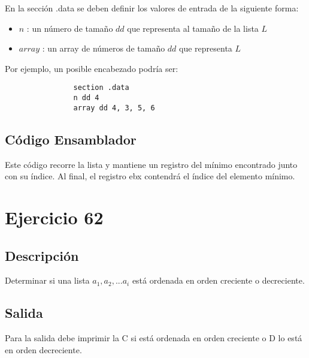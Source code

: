 \documentclass[a4paper]{article}
\begin{document}
\begin{flushleft}
      		En la sección .data se deben definir los valores de entrada de la siguiente forma:
      		
      		\begin{itemize}
      			
      			\item $n$ : un número de tamaño $dd$ que representa al tamaño de la lista $L$
      			
      			\item $array$ : un array de números de tamaño $dd$ que representa $L$
      			
      			
      		\end{itemize}
      	
      		Por ejemplo, un posible encabezado podría ser:
      		
      		\begin{lstlisting}
      			section .data
      			n dd 4
      			array dd 4, 3, 5, 6
      		\end{lstlisting}
      		
      		\subsection*{Código Ensamblador}
      		
      		Este código recorre la lista y mantiene un registro del mínimo encontrado junto con su índice. Al final, el registro ebx contendrá el índice del elemento mínimo.
      		
      		\section{Ejercicio 62}
      		
      		\subsection*{Descripción}
      		
      		 Determinar si una lista $a_{1}, a_{2}, ... a_{i}$ está ordenada en orden creciente o decreciente.
      		 
      		 \subsection*{Salida}
      		 
      		 Para la salida debe imprimir la C si está ordenada en orden creciente o D lo está en orden decreciente.\newline
      		 

\end{flushleft}
\end{document}
